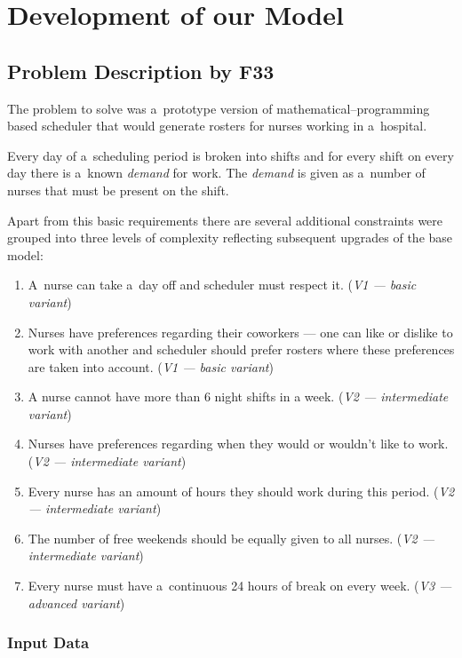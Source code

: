 \section{Development of our Model}

\subsection{Problem Description by F33}

The problem to solve was a~prototype version of mathematical--programming based scheduler that would generate rosters for nurses working in a~hospital. 

Every day of a~scheduling period is broken into shifts and for every shift on every day there is a~known \textit{demand} for work. The \textit{demand} is given as a~number of nurses that must be present on the shift.

Apart from this basic requirements there are several additional constraints were grouped into three levels of complexity reflecting subsequent upgrades of the base model:

\begin{enumerate}
    \item A~nurse can take a~day off and scheduler must respect it. (\textit{V1 --- basic variant})
    \item Nurses have preferences regarding their coworkers --- one can like or dislike to work with another and scheduler should prefer rosters where these preferences are taken into account. (\textit{V1 --- basic variant})
    \item A nurse cannot have more than 6 night shifts in a week. (\textit{V2 --- intermediate variant})
    \item Nurses have preferences regarding when they would or wouldn't like to work. (\textit{V2 --- intermediate variant})
    \item Every nurse has an amount of hours they should work during this period. (\textit{V2 --- intermediate variant})
    \item The number of free weekends should be equally given to all nurses. (\textit{V2 --- intermediate variant})
    \item Every nurse must have a~continuous 24 hours of break on every week. (\textit{V3 --- advanced variant})
\end{enumerate}

\subsubsection{Input Data}

